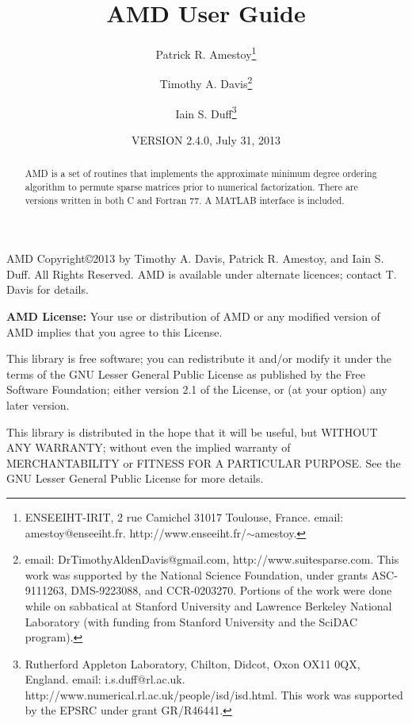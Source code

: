 \documentclass[11pt]{article}
\begin{document}

\title{AMD User Guide}
\author{Patrick R. Amestoy\thanks{ENSEEIHT-IRIT,
2 rue Camichel 31017 Toulouse, France.
email: amestoy@enseeiht.fr.  http://www.enseeiht.fr/$\sim$amestoy.}
\and Timothy A. Davis\thanks{
email: DrTimothyAldenDavis@gmail.com,
http://www.suitesparse.com.
This work was supported by the National
Science Foundation, under grants ASC-9111263, DMS-9223088, and CCR-0203270.
Portions of the work were done while on sabbatical at Stanford University
and Lawrence Berkeley National Laboratory (with funding from Stanford
University and the SciDAC program).
}
\and Iain S. Duff\thanks{Rutherford Appleton Laboratory, Chilton, Didcot, 
Oxon OX11 0QX, England. email: i.s.duff@rl.ac.uk.  
http://www.numerical.rl.ac.uk/people/isd/isd.html.
This work was supported by the EPSRC under grant GR/R46441.
}}

\date{VERSION 2.4.0, July 31, 2013}
\maketitle

\begin{abstract}
AMD is a set of routines that implements the approximate minimum degree ordering
algorithm to permute sparse matrices prior to
numerical factorization.
There are versions written in both C and Fortran 77.
A MATLAB interface is included.
\end{abstract}

AMD Copyright\copyright 2013 by Timothy A.
Davis, Patrick R. Amestoy, and Iain S. Duff.  All Rights Reserved.
AMD is available under alternate licences; contact T. Davis for details.

{\bf AMD License:}
    Your use or distribution of AMD or any modified version of
    AMD implies that you agree to this License.

    This library is free software; you can redistribute it and/or
    modify it under the terms of the GNU Lesser General Public
    License as published by the Free Software Foundation; either
    version 2.1 of the License, or (at your option) any later version.

    This library is distributed in the hope that it will be useful,
    but WITHOUT ANY WARRANTY; without even the implied warranty of
    MERCHANTABILITY or FITNESS FOR A PARTICULAR PURPOSE.  See the GNU
    Lesser General Public License for more details.
\end{document}
